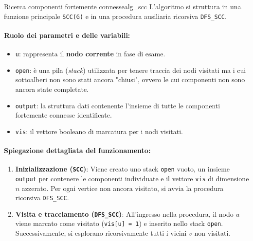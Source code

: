 \documentclass[12pt]{report}
\begin{document}
	\begin{algoritmo}{Ricerca componenti fortemente connesse}{alg_scc}
		L'algoritmo si struttura in una funzione principale \texttt{SCC(G)} e in una procedura ausiliaria ricorsiva \texttt{DFS\_SCC}.
		
		\paragraph{Ruolo dei parametri e delle variabili:}
		\begin{itemize}
			\item \texttt{u}: rappresenta il \textbf{nodo corrente} in fase di esame.
			\item \texttt{open}: è una pila (\emph{stack}) utilizzata per tenere traccia dei nodi visitati ma i cui sottoalberi non sono stati ancora "chiusi", ovvero le cui componenti non sono ancora state completate.
			\item \texttt{output}: la struttura dati contenente l'insieme di tutte le componenti fortemente connesse identificate.
			\item \texttt{vis}: il vettore booleano di marcatura per i nodi visitati.
		\end{itemize}
		
		\paragraph{Spiegazione dettagliata del funzionamento:}
		\begin{enumerate}
			\item \textbf{Inizializzazione (\texttt{SCC})}:
			Viene creato uno stack \texttt{open} vuoto, un insieme \texttt{output} per contenere le componenti individuate e il vettore \texttt{vis} di dimensione $n$ azzerato. Per ogni vertice non ancora visitato, si avvia la procedura ricorsiva \texttt{DFS\_SCC}.
			
			\item \textbf{Visita e tracciamento (\texttt{DFS\_SCC})}:
			All'ingresso nella procedura, il nodo $u$ viene marcato come visitato (\texttt{vis[u] = 1}) e inserito nello stack \texttt{open}. Successivamente, si esplorano ricorsivamente tutti i vicini $v$ non visitati.
			

\end{enumerate}
\end{algoritmo}
\end{document}
